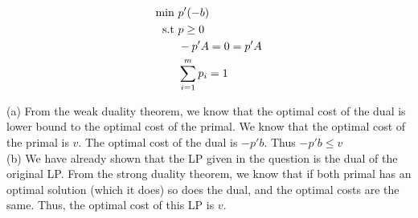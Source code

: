\begin{align}
    \text{min } &p'(-b) \notag\\
    \text{s.t }  &p \ge 0  \notag\\
                &-p'A = 0 = p'A \notag\\
                &\sum_{i=1}^{m} p_i = 1 \notag
\end{align}

(a) From the weak duality theorem, we know that the optimal cost of the dual is lower bound to the optimal cost of the primal. We know that the optimal cost of the primal is $v$. The optimal cost of the dual is $-p'b$. Thus $-p'b \le v$ \\

(b) We have already shown that the LP given in the question is the dual of the original LP. From the strong duality theorem, we know that if both primal has an optimal solution (which it does) so does the dual, and the optimal costs are the same. Thus, the optimal cost of this LP is $v$.